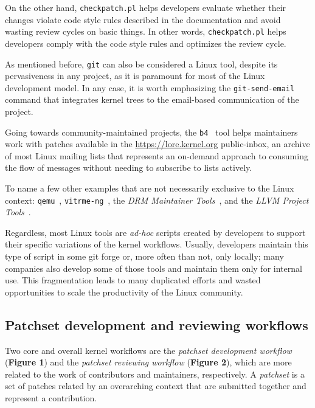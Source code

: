 On the other hand, \texttt{checkpatch.pl} helps developers evaluate whether
their changes violate code style rules described in the documentation and avoid
wasting review cycles on basic things. In other words, \texttt{checkpatch.pl}
helps developers comply with the code style rules and optimizes the review
cycle.

As mentioned before, \texttt{git} can also be considered a Linux tool, despite
its pervasiveness in any project, as it is paramount for most of the Linux
development model. In any case, it is worth emphasizing the
\texttt{git-send-email} command that integrates kernel trees to the email-based
communication of the project.

Going towards community-maintained projects, the \texttt{b4}~\cite{b4_swh} tool
helps maintainers work with patches available in the
\url{https://lore.kernel.org} public-inbox, an archive of most Linux mailing
lists that represents an on-demand approach to consuming the flow of messages
without needing to subscribe to lists actively.

To name a few other examples that are not necessarily exclusive to the Linux
context: \texttt{qemu}~\cite{qemu-project}, \texttt{vitrme-ng}~\cite{virtme-ng},
the \textit{DRM Maintainer Tools}~\cite{drm-maintainer-tools}, and the
\textit{LLVM Project Tools}~\cite{llvm-project}.

Regardless, most Linux tools are \textit{ad-hoc} scripts created by developers
to support their specific variations of the kernel workflows. Usually,
developers maintain this type of script in some git forge or, more often than
not, only locally; many companies also develop some of those tools and maintain
them only for internal use. This fragmentation leads to many duplicated efforts
and wasted opportunities to scale the productivity of the Linux community.

\subsection{Patchset development and reviewing workflows}

Two core and overall kernel workflows are the \textit{patchset development
workflow} (\textbf{Figure 1}) and the \textit{patchset reviewing workflow}
(\textbf{Figure 2}), which are more related to the work of contributors and
maintainers, respectively. A \textit{patchset} is a set of patches related by an
overarching context that are submitted together and represent a contribution.

